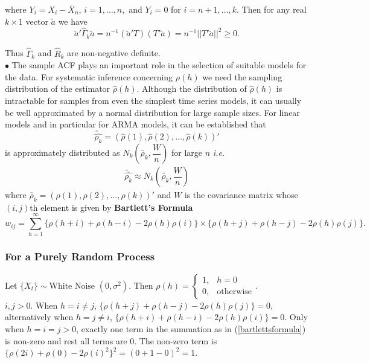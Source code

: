 \documentclass[11pt, a4paper]{article}
\numberwithin{equation}{section}
\theoremstyle{definition}
\begin{document}
where $Y_i = X_i - \bar{X}_n$, $i = 1, \dots, n,$ and $Y_i = 0$ for $i = n+1, \dots, k.$ Then for any real $k \times 1$ vector $\utilde{a}$ we have
$$ \utilde{a}' \hat{\Gamma}_k \utilde{a} = n^{-1}(\utilde{a}'T)(T'\utilde{a}) = n^{-1} ||T'\utilde{a}||^2 \geq 0.$$

Thus $\hat{\Gamma}_k$ and $\hat{R}_k$ are non-negative definite. \\[0.25em]

$\bullet$  The sample ACF plays an important role in the selection of suitable models for the data. For systematic inference concerning $\rho(h)$ we need the sampling distribution of the estimator $\hat{\rho}(h)$. Although the distribution of $\hat{\rho}(h)$ is intractable for samples from even the simplest time series models, it can usually be well approximated by a normal distribution for large sample sizes. For linear models and in particular for ARMA models, it can be established that 
$$\utilde{\hat{\rho_k}} = \left( \hat{\rho}(1), \hat{\rho}(2), \ldots, \hat{\rho}(k)\right)'$$ 
is approximately distributed as $N_k\left( \utilde{\rho_k}, \dfrac{W}{n} \right)$ for large $n$ \textit{i.e.} 
\begin{align}\label{largesampledistributionofsampleacfs}
\utilde{\hat{\rho_k}} \approx N_k\left( \utilde{\rho_k}, \dfrac{W}{n} \right)
\end{align}
where $\utilde{\rho_k} = \left( \rho(1), \rho(2), \ldots, \rho(k) \right)'$ and $W$ is the covariance matrix whose $(i, j)$th element is given by \textbf{Bartlett's Formula}
\begin{equation}\label{bartlettsformula}
w_{ij} = \sum \limits_{h = 1}^{\infty} \{\rho(h+i) + \rho(h-i) - 2\rho(h)\rho(i)\} \times \{\rho(h+j) + \rho(h-j) - 2\rho(h)\rho(j)\}.
\end{equation}

\subsubsection{For a Purely Random Process}

Let $\{X_t\} \sim \text{White Noise }(0, \sigma^2)$. Then $\rho(h) = \begin{cases}1, &h=0 \\ 0, &\text{otherwise}\end{cases}$.\\[0.25em]

$i, j > 0$. When $h = i \neq j$, $\{\rho(h+j) + \rho(h-j) - 2\rho(h)\rho(j)\} = 0$, alternatively when $h = j \neq i$, $\{\rho(h+i) + \rho(h-i) - 2\rho(h)\rho(i)\} = 0$. Only when $h = i = j > 0$, exactly one term in the summation as in (\ref{bartlettsformula}) is non-zero and rest all terms are $0$. The non-zero term is $\{\rho(2i) + \rho(0) - 2\rho(i)^2\}^2 = (0 + 1 - 0)^2 = 1$. \\[0.25em]
\end{document}

